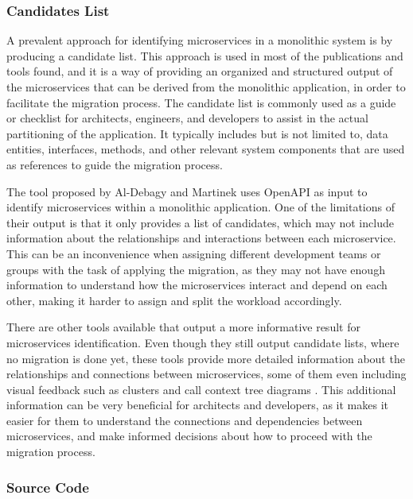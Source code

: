 \subsubsection*{Candidates List}

A prevalent approach for identifying microservices in a monolithic system is by
producing a candidate list. This approach is used in most of the publications
and tools found, and it is a way of providing an organized and structured
output of the microservices that can be derived from the monolithic
application, in order to facilitate the migration process. The candidate list
is commonly used as a guide or checklist for architects, engineers, and
developers to assist in the actual partitioning of the application. It
typically includes but is not limited to, data entities, interfaces, methods,
and other relevant system components that are used as references to guide the
migration process.

The tool proposed by Al-Debagy and Martinek  uses OpenAPI as
input to identify microservices within a monolithic application. One of the
limitations of their output is that it only provides a list of candidates,
which may not include information about the relationships and interactions
between each microservice. This can be an inconvenience when assigning
different development teams or groups with the task of applying the migration,
as they may not have enough information to understand how the microservices
interact and depend on each other, making it harder to assign and split the
workload accordingly.

There are other tools available that output a more informative result for
microservices identification. Even though they still output candidate lists,
where no migration is done yet, these tools provide more detailed information
about the relationships and connections between microservices, some of them
even including visual feedback such as clusters and call context tree diagrams
. This additional information can be very beneficial
for architects and developers, as it makes it easier for them to understand the
connections and dependencies between microservices, and make informed decisions
about how to proceed with the migration process.

\subsubsection*{Source Code}

